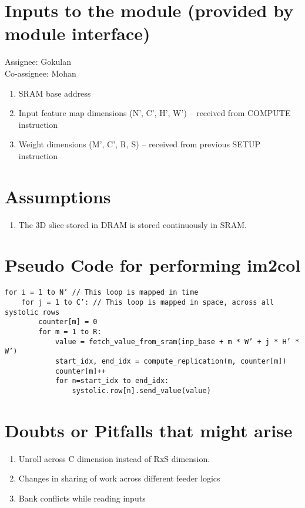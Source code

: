 \section{Inputs to the module (provided by module interface)}
Assignee: Gokulan \\Co-assignee: Mohan
\begin{enumerate}
  \item SRAM base address
  \item Input feature map dimensions (N', C', H', W') -- received from COMPUTE instruction
  \item Weight dimensions (M', C', R, S) -- received from previous SETUP instruction
\end{enumerate}

\section{Assumptions}
\begin{enumerate}
    \item The 3D slice stored in DRAM is stored continuously in SRAM.
\end{enumerate}

\section{Pseudo Code for performing im2col}

\begin{lstlisting}
for i = 1 to N’ // This loop is mapped in time
	for j = 1 to C’: // This loop is mapped in space, across all systolic rows
		counter[m] = 0
		for m = 1 to R:
			value = fetch_value_from_sram(inp_base + m * W’ + j * H’ * W’)
			start_idx, end_idx = compute_replication(m, counter[m])
			counter[m]++
			for n=start_idx to end_idx:
				systolic.row[n].send_value(value)
\end{lstlisting}

\section{Doubts or Pitfalls that might arise}

\begin{enumerate}
    \item Unroll across C dimension instead of RxS dimension.
    \item Changes in sharing of work across different feeder logics
    \item Bank conflicts while reading inputs
\end{enumerate}
